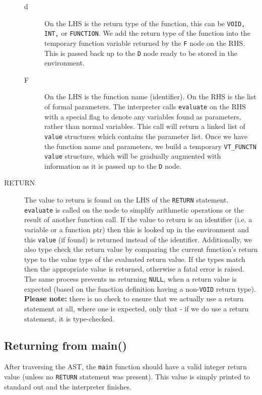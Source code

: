\begin{description}
\begin{description}
			\item[d] On the LHS is the return type of the function, this can be \verb!VOID, INT,! or \verb!FUNCTION!. We add the return type of the function into the temporary function variable returned by the \verb!F! node on the RHS. This is passed back up to the \verb!D! node ready to be stored in the environment.
			\item[F] On the LHS is the function name (identifier). On the RHS is the list of formal parameters. The interpreter calls \verb!evaluate! on the RHS with a special flag to denote any variables found as parameters, rather than normal variables. This call will return a linked list of \verb!value! structures which contains the parameter list. Once we have the function name and parameters, we build a temporary \verb!VT_FUNCTN value! structure, which will be gradually augmented with information as it is passed up to the \verb!D! node.
		\end{description}
	\item[RETURN] The value to return is found on the LHS of the \verb!RETURN! statement. \verb!evaluate! is called on the node to simplify arithmetic operations or the result of another function call. If the value to return is an identifier (i.e. a variable or a function ptr) then this is looked up in the environment and this \verb!value! (if found) is returned instead of the identifier. Additionally, we also type  check the return value by comparing the current function's return type to the value type of the evaluated return value. If the types match then the appropriate value is returned, otherwise a fatal error is raised. The same process prevents us returning \verb!NULL!, when a return value is expected (based on the function definition having a non-\verb!VOID! return type). \textbf{Please note:} there is no check to ensure that we actually use a return statement at all, where one is expected, only that - if we do use a return statement, it is type-checked.
\end{description}

\subsection{Returning from main()}
After traversing the AST, the \verb!main! function should have a valid integer return value (unless no \verb!RETURN! statement was present). This value is simply printed to standard out and the interpreter finishes.

